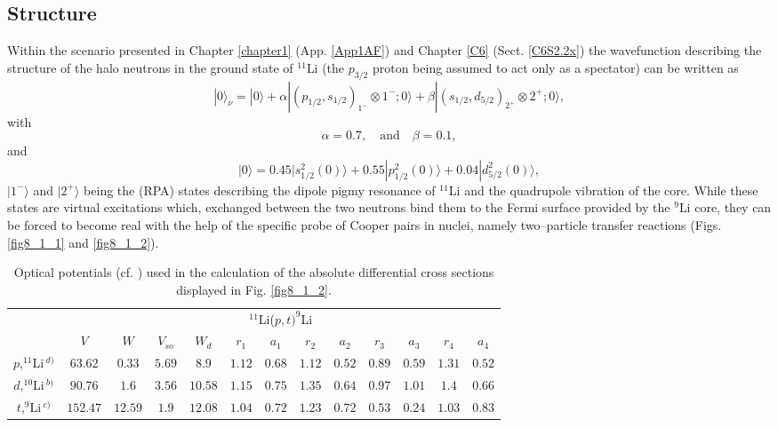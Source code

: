  
 
 
 
 
 

\subsection{Structure}
Within the scenario presented in Chapter \ref{chapter1}  (App. \ref{App1AF}) and Chapter \ref{C6} (Sect. \ref{C6S2.2x}) the wavefunction describing the structure of the halo neutrons in the ground state of $^{11}$Li (the $p_{3/2}$ proton being assumed to act only as a spectator) can be written as
\begin{equation}\label{eq8_2_1}
|0\rangle_\nu=|0\rangle+\alpha|(p_{1/2},s_{1/2})_{1^-}\otimes 1^-;0\rangle+\beta|(s_{1/2},d_{5/2})_{2^+}\otimes 2^+;0\rangle,
\end{equation}
with
\begin{equation}\label{eq8_2_2}
\alpha=0.7,\quad \text{and} \quad \beta=0.1,
\end{equation}
and
\begin{equation}\label{eq8_2_3}
|0\rangle=0.45|s_{1/2}^2(0)\rangle+0.55|p_{1/2}^2(0)\rangle+0.04|d_{5/2}^2(0)\rangle,
\end{equation}
$|1^-\rangle$ and $|2^+\rangle$ being the (RPA) states describing the dipole pigmy resonance of $^{11}$Li and the quadrupole vibration of the core. While these states are virtual excitations which, exchanged between the two neutrons bind them to the Fermi surface provided by the $^9$Li core, they can be forced to become real with the help of the specific probe of Cooper pairs in nuclei, namely two--particle transfer reactions (Figs. \ref{fig8_1_1} and \ref{fig8_1_2}).
\begin{table}[h!]
{\begin{tabular}{|c|c|c|c|c|c|c|c|c|c|c|c|c|}
\cline{2-13} 
\multicolumn{1}{c|}{}& \multicolumn{12}{|c|}{$^{11}$Li($p,t)^{9}$Li}           \\
\cline{2-13} 
\multicolumn{1}{c|}{} & $V$ & $W$ &  $V_{so}$ &  $W_d$ &  $r_1$ &  $a_1$ &  $r_2$ &  $a_2$ &  $r_3$ &  $a_3$ &  $r_4$ &  $a_4$            \\
\hline 
$p$,\;$^{11}$Li$\,^{d)}$ & $63.62$ & $0.33$ &  $5.69$ &  $8.9$ &  $1.12$ &  $0.68$ &  $1.12$ &  $0.52$ &  $0.89$ &  $0.59$ &  $1.31$ &  $0.52$ \\
\hline 
$d$,\;$^{10}$Li$\,^{b)}$ & $90.76$ & $1.6$ &  $3.56$ &  $10.58$ &  $1.15$ &  $0.75$ &  $1.35$ &  $0.64$ &  $0.97$ &  $1.01$ &  $1.4$ &  $0.66$ \\
\hline 
$t$,\;$^{9}$Li$\,^{c)}$ & $152.47$ & $12.59$ &  $1.9$ &  $12.08$ &  $1.04$ &  $0.72$ &  $1.23$ &  $0.72$ &  $0.53$ &  $0.24$ &  $1.03$ &  $0.83$ \\
\hline 

\hline 
  \end{tabular}}
   \caption{Optical potentials (cf. \cite{Tanihata:08}) used in the calculation of the absolute differential cross sections displayed in Fig. \ref{fig8_1_2}.}
\label{tab8.1.1}
\end{table}


